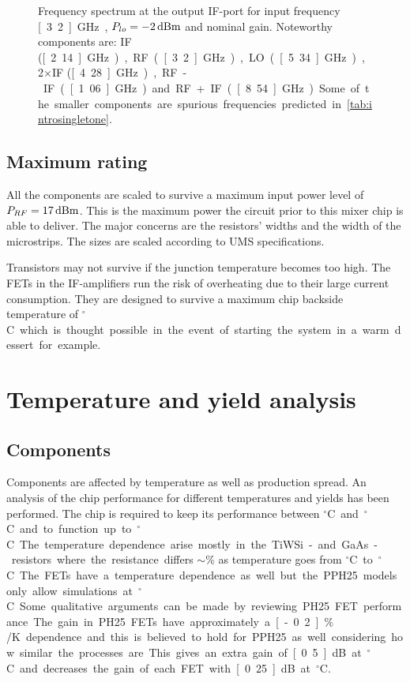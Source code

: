 			\begin{figure}[hbt!]
				\centering
				\caption[IF-port output spectrum.]{Frequency spectrum at the output IF-port for input frequency \unit[3.2]{GHz}, $P_{lo}=\unit[-2]{dBm}$ and nominal gain. Noteworthy components are: IF (\unit[2.14]{GHz}), RF (\unit[3.2]{GHz}), LO (\unit[5.34]{GHz}), 2$\times$IF (\unit[4.28]{GHz}), RF-IF (\unit[1.06]{GHz}) and RF+IF (\unit[8.54]{GHz}). Some of the smaller components are spurious frequencies predicted in \autoref{tab:introsingletone}.}\label{fig:sysspectrum}
			\end{figure}
			

			
		\subsection{Maximum rating}
			All the components are scaled to survive a maximum input power level of $P_{RF}=\unit[17]{dBm}$. This is the maximum power the circuit prior to this mixer chip is able to deliver. The major concerns are the resistors' widths and the width of the microstrips. The sizes are scaled according to UMS specifications.\autocite{pph25manual}
			
			Transistors may not survive if the junction temperature becomes too high. The FETs in the IF-amplifiers run the risk of overheating due to their large current consumption. They are designed to survive a maximum chip backside temperature of \unit[100]{$^\circ$C} which is thought possible in the event of starting the system in a warm dessert for example.
			
	
	\section{Temperature and yield analysis}	
		\subsection{Components}
			Components are affected by temperature as well as production spread. An analysis of the chip performance for different temperatures and yields has been performed. The chip is required to keep its performance between \unit[-40]{$^\circ$C} and \unit[55]{$^\circ$C} and to function up to \unit[85]{$^\circ$C}. 			
			
			The temperature dependence arise mostly in the TiWSi- and GaAs-resistors where the resistance differs $\sim$\unit[10]{\%} as temperature goes from \unit[20]{$^\circ$C} to \unit[85]{$^\circ$C}. The FETs have a temperature dependence as well but the PPH25 models only allow simulations at \unit[20]{$^\circ$C}. Some qualitative arguments can be made by reviewing PH25 FET performance. The gain in PH25 FETs have approximately a \unit[-0.2]{$\%$/K} dependence and this is believed to hold for PPH25 as well considering how similar the processes are. This gives an extra gain of \unit[0.5]{dB} at \unit[-40]{$^\circ$C} and decreases the gain of each FET with \unit[0.25]{dB} at \unit[55]{$^\circ$C}.		


